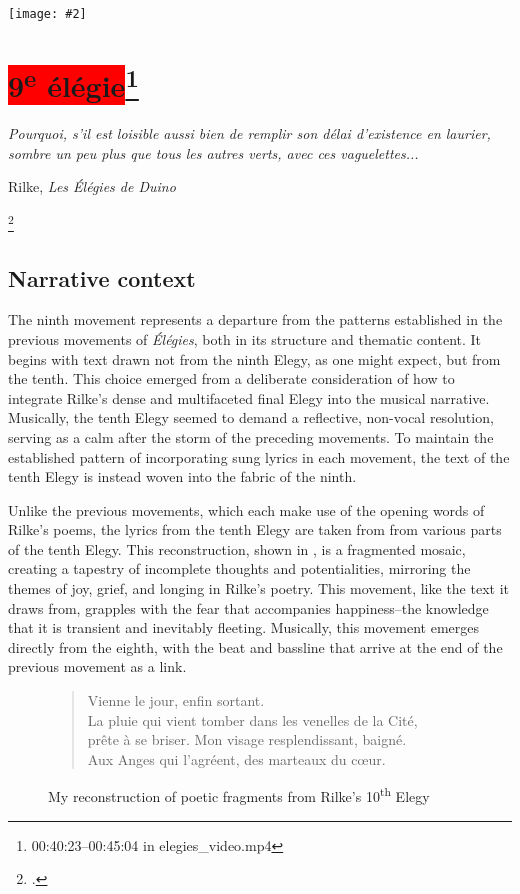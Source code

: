 \documentclass[12pt,twoside,maitrise]{dms_ks}
\newcommand{\customincludeexamples}[4][]{%
    \begin{example}[H]
        \centering
        \texttt{[image: \#2]}
        \caption{#4}
	\label{#3} 
    \end{example}
}
\theoremstyle{definition}
\begin{document}
{\customincludeexamples[width=\textwidth]{8e_3}{ex:8e_3}{The voice singing subharmonics against the bed track as well as the entry of the bassline over the beat (mm. 31-38).}

\section{\colorbox{red}{9\textsuperscript{e} élégie}\footnote{00:40:23--00:45:04 in elegies\_video.mp4}}

\epigraph{\textit{Pourquoi, s’il est loisible aussi bien de remplir son délai d’existence en laurier, sombre un peu plus que tous les autres verts, avec ces vaguelettes...}}{Rilke, \textit{Les Élégies de Duino}\protect\footnotemark}

\footcitetext[83]{rilke_egies_1986}

\subsection{Narrative context}

The ninth movement represents a departure from the patterns established in the previous movements of \textit{Élégies}, both in its structure and thematic content. 
It begins with text drawn not from the ninth Elegy, as one might expect, but from the tenth. 
This choice emerged from a deliberate consideration of how to integrate Rilke’s dense and multifaceted final Elegy into the musical narrative. 
Musically, the tenth Elegy seemed to demand a reflective, non-vocal resolution, serving as a calm after the storm of the preceding movements. 
To maintain the established pattern of incorporating sung lyrics in each movement, the text of the tenth Elegy is instead woven into the fabric of the ninth.

Unlike the previous movements, which each make use of the opening words of Rilke's poems, the lyrics from the tenth Elegy are taken from from various parts of the tenth Elegy. 
This reconstruction, shown in , is a fragmented mosaic, creating a tapestry of incomplete thoughts and potentialities, mirroring the themes of joy, grief, and longing in Rilke’s poetry. 
This movement, like the text it draws from, grapples with the fear that accompanies happiness--the knowledge that it is transient and inevitably fleeting. 
Musically, this movement emerges directly from the eighth, with the beat and bassline that arrive at the end of the previous movement as a link.

\begin{figure}[H]
\begin{verse}
Vienne le jour, enfin sortant.\\ 
La pluie qui vient tomber dans les venelles de la Cité,\\ 
prête à se briser. Mon visage resplendissant, baigné.\\ 
Aux Anges qui l'agréent, des marteaux du cœur.\\
\end{verse}  
	\caption{My reconstruction of poetic fragments from Rilke's 10\textsuperscript{th} Elegy} 
\label{fig:poem}
\end{figure}

}
\end{document}
